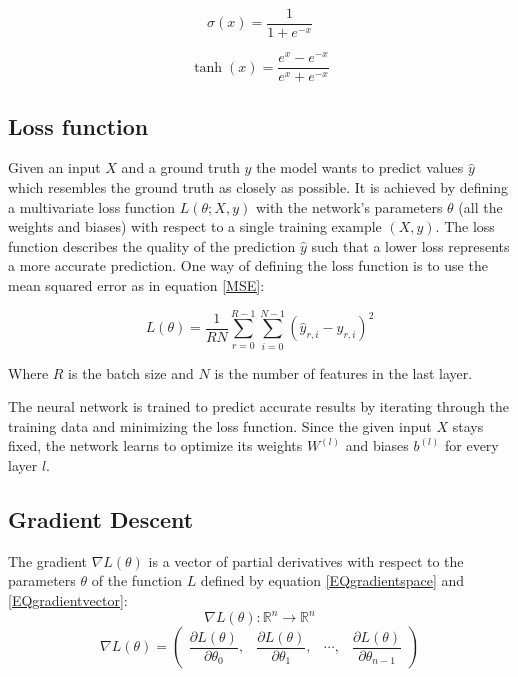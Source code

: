 \documentclass[a4paper, twoside]{article}
\newcommand*{\pd}[2]{\ensuremath{\dfrac{\partial #1}{\partial #2}}}
\begin{document}
\begin{equation}\label{sigmoid}
\sigma(x) = \frac{1}{1+e^{-x}}
\end{equation}

\begin{equation}\label{tanh}
\tanh{(x)} = \frac{e^x-e^{-x}}{e^x+e^{-x}}
\end{equation}



\subsection{Loss function}
Given an input $X$ and a ground truth $y$ the model wants to predict values $\hat{y}$ which resembles the ground truth as closely as possible. It is achieved by defining a multivariate loss function $L(\theta; X, y)$  with the network's parameters $\theta$ (all the weights and biases) with respect to a single training example $(X, y)$. The loss function describes the quality of the prediction $\hat{y}$ such that a lower loss represents a more accurate prediction. One way of defining the loss function is to use the mean squared error as in equation \eqref{MSE}: \cite{cs231n}

\begin{equation}\label{MSE}
L(\theta) = \frac{1}{RN} \sum^{R-1}_{r=0} \sum^{N-1}_{i=0} (\hat{y}_{r,i}-y_{r,i})^2
\end{equation}

Where $R$ is the batch size and $N$ is the number of features in the last layer.

The neural network is trained to predict accurate results by iterating through the training data and minimizing the loss function. Since the given input $X$ stays fixed, the network learns to optimize its weights $W^{(l)}$ and biases $b^{(l)}$ for every layer $l$. \cite{cs231n} \cite{wikiStanford}

\subsection{Gradient Descent}
The gradient $\nabla L(\theta)$ is a vector of partial derivatives with respect to the parameters $\theta$ of the function $L$ defined by equation \eqref{EQgradientspace} and \eqref{EQgradientvector}: \cite{gradient} \cite{convmath} 
\begin{equation}\label{EQgradientspace}
\nabla L(\theta) : \mathbb{R}^n \to \mathbb{R}^n
\end{equation}
\begin{equation}\label{EQgradientvector}
\nabla L(\theta) = 
	\begin{pmatrix} 
		\pd{L(\theta)}{\theta_{0}}, & 
		\pd{L(\theta)}{\theta_{1}}, &
		\cdots, &
		\pd{L(\theta)}{\theta_{n-1}}
		
		\end{pmatrix}
\end{equation}
\end{document}
